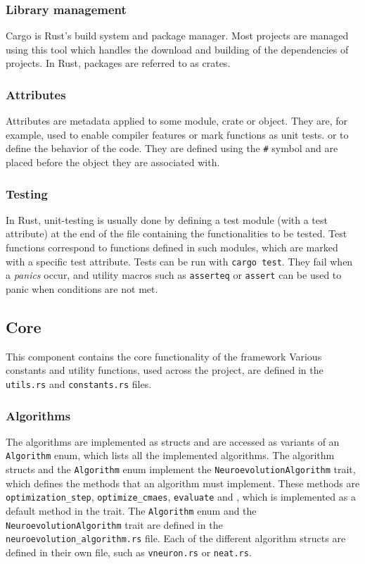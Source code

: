 \subsubsection{Library management}

Cargo is Rust's build system and package manager. Most projects are managed using this tool which handles the download and building of the dependencies of projects.
In Rust, packages are referred to as crates.

\subsubsection{Attributes}

Attributes are metadata applied to some module, crate or object. They are, for example, used to enable compiler features or mark functions as unit tests.
or to define the behavior of the code. They are defined using the \texttt{\#} symbol and are placed before the object they are associated with.

\subsubsection{Testing}

In Rust, unit-testing is usually done by defining a test module (with a test attribute) at the end of the file containing the functionalities to be
tested. Test functions correspond to functions defined in such modules, which are marked with a specific test attribute. Tests can be run
with \texttt{cargo test}. They fail when a \textit{panics} occur, and utility macros such as \texttt{asserteq} or \texttt{assert} can be used to panic
when conditions are not met.

\subsection{Core}

This component contains the core functionality of the framework
Various constants and utility functions, used across the project, are defined in the \texttt{utils.rs} and \texttt{constants.rs} files.

\subsubsection{Algorithms}

The algorithms are implemented as structs and are accessed as variants of an \texttt{Algorithm} enum, which lists all the implemented algorithms.
The algorithm structs and the \texttt{Algorithm} enum implement the \texttt{NeuroevolutionAlgorithm} trait, which defines the methods that an algorithm must implement.
These methods are \texttt{optimization\_step}, \texttt{optimize\_cmaes}, \texttt{evaluate} and , which is implemented as a default method in the trait.
The \texttt{Algorithm} enum and the \texttt{NeuroevolutionAlgorithm} trait are defined in the \texttt{neuroevolution\_algorithm.rs} file.
Each of the different algorithm structs are defined in their own file, such as \texttt{vneuron.rs} or \texttt{neat.rs}.

